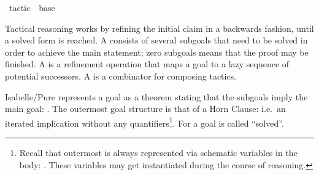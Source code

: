 %
\begin{isabellebody}%
\def\isabellecontext{tactic}%
%
\isadelimtheory
\isanewline
\isanewline
\isanewline
%
\endisadelimtheory
%
\isatagtheory
{}\isamarkupfalse%
\ tactic\ \ base\ %
\endisatagtheory
{\isafoldtheory}%
%
\isadelimtheory
%
\endisadelimtheory
%
\isamarkuptrue%
%
\begin{isamarkuptext}%
Tactical reasoning works by refining the initial claim in a
  backwards fashion, until a solved form is reached.  A 
  consists of several subgoals that need to be solved in order to
  achieve the main statement; zero subgoals means that the proof may
  be finished.  A  is a refinement operation that maps
  a goal to a lazy sequence of potential successors.  A  is a combinator for composing tactics.%
\end{isamarkuptext}%
\isamarkuptrue%
%
\isamarkuptrue%
%
\begin{isamarkuptext}%
Isabelle/Pure represents a goal as a theorem stating that the subgoals imply the main
  goal: .  The outermost goal
  structure is that of a Horn Clause: i.e.\ an iterated implication without any
  quantifiers\footnote{Recall that outermost  is
  always represented via schematic variables in the body: .  These variables may get instantiated during the course of
  reasoning.}.  For  a goal is called ``solved''.


\end{isamarkuptext}
\end{isabellebody}
